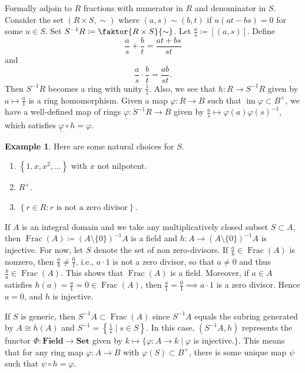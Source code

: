 \documentclass[10pt,letterpaper,cm]{nupset}
\theoremstyle{definition}
\newtheorem{exmp}[definition]{Example}
\theoremstyle{theorem}
\theoremstyle{remark}
\newcommand{\1}{\mathbf{1}}
\newcommand{\0}{\vec 0}
\DeclareMathOperator{\im}{im}
\DeclareMathOperator{\Frac}{Frac}
\begin{document}
Formally adjoin to $R$ fractions with numerator in $R$ and denominator in $S$. Consider the set $\left(R \times S, \sim\right)$ where $\left(a, s\right) \sim \left(b,t\right)$ if $u(at-bs) =0$ for some $u\in S$. Set $S^{-1}R \coloneqq  \faktor{R\times S}{\sim}$. Let $\frac{a}{s} \coloneqq  [(a,s)]$. Define $$\frac{a}{s} + \frac{b}{t} = \frac{at+bs}{st}$$ and $$\frac{a}{s}\cdot \frac{b}{t} = \frac{ab}{st}.$$ Then $S^{-1}R$ becomes a ring with unity $\frac{1}{1}$. Also, we see that $h: R \to S^{-1}R$ given by $a\mapsto \frac{a}{1}$ is a ring homomorphism. Given a map $\varphi: R \to B$ such that $\im{\varphi} \subset B^{\times}$, we have a well-defined map of rings $\underline{\varphi} : S^{-1}R \to B$ given by $\frac{a}{s} \mapsto \varphi(a) \varphi(s)^{-1}$, which satisfies $\underline{\varphi} \circ h = \varphi$. 


\begin{exmp}
Here are some natural choices for $S$.
\begin{enumerate}[label=(\alph*)]
\item  $\left\{1, x, x^2, \ldots \right\}$ with $x$ not nilpotent.
\item $R^{\times}$.
\item $\left\{r\in R : r \text{ is not a zero divisor}\right\}$.
\end{enumerate}
\end{exmp}

\smallskip

If $A$ is an integral domain and we take any multiplicatively closed subset $S\subset A$, then $\Frac(A)\coloneqq  \left(A \setminus \{0\}\right)^{-1}A$ is a field and $h : A \to \left(A \setminus \{0\}\right)^{-1}A$ is injective. For now, let $S$ denote the set of non zero-divisors.  If $\frac{a}{b} \in \Frac(A)$ is nonzero, then $\frac{a}{b} \ne \frac{0}{1}$, i.e., $a\cdot 1$ is not a zero divisor, so that $a\ne 0$ and thus $\frac{b}{a} \in \Frac(A)$. This shows that $\Frac(A)$ is a field. Moreover, if $a\in A$ satisfies $h(a) = \frac{a}{1} = 0\in \Frac(A)$, then $\frac{a}{1}= \frac{0}{1} \implies a\cdot 1$ is a zero divisor. Hence $a=0$, and $h$ is injective. 

If $S$ is generic, then $S^{-1}A \subset \Frac(A)$ since $S^{-1}A$ equals the subring generated by $A\cong h(A)$ and $S^{-1} = \left\{\frac{1}{s}\mid s\in S\right\}$. In this case, $\left(S^{-1}A, h\right)$ represents the functor $\Phi : \mathbf{Field} \to \mathbf{Set}$ given by $k \mapsto \{\varphi : A \to k \mid \varphi$ is injective.$\}$. This means that for any ring map $\varphi: A \to B$ with $\varphi(S) \subset B^{\times}$, there is some unique map $\psi$ such that $\psi \circ h = \varphi$.
\end{document}
